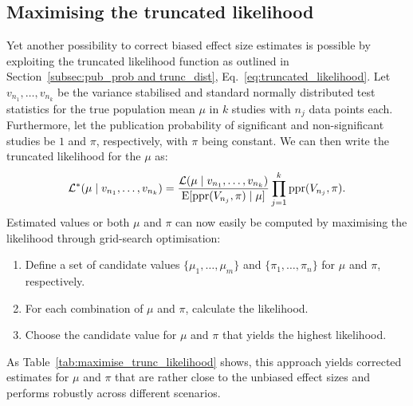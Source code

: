 \subsection{Maximising the truncated likelihood}
Yet another possibility to correct biased effect size estimates is possible by exploiting the truncated likelihood function as outlined in Section~\ref{subsec:pub_prob and trunc_dist}, Eq.~\ref{eq:truncated_likelihood}. Let $v_{n_1},\dots,v_{n_k}$ be the variance stabilised and standard normally distributed test statistics for the true population mean $\mu$ in $k$ studies with $n_j$ data points each. Furthermore, let the publication probability of significant and non-significant studies be $1$ and $\pi$, respectively, with $\pi$ being constant. We can then write the truncated likelihood for the $\mu$ as:
\begin{align*}
        \mathcal{L}^{*}(\mu \mid v_{n_1},\dots,v_{n_k}) = \frac{\mathcal{L}(\mu \mid v_{n_1},\dots,v_{n_k})}{\operatorname{\text{E}}[\operatorname{\text{ppr}}(V_{n_j},\pi)\mid \mu]}\prod_{j=1}^k \operatorname{\text{ppr}}(V_{n_j},\pi).
\end{align*}
Estimated values or both $\mu$ and $\pi$ can now easily be computed by maximising the likelihood through grid-search optimisation: 
\begin{enumerate}
    \item Define a set of candidate values $\{\mu_1,\dots,\mu_m\}$ and $\{\pi_1,\dots,\pi_n\}$ for $\mu$ and $\pi$, respectively.
    \item For each combination of $\mu$ and $\pi$, calculate the likelihood.
    \item Choose the candidate value for $\mu$ and $\pi$ that yields the highest likelihood.
\end{enumerate}
As Table~\ref{tab:maximise_trunc_likelihood} shows, this approach yields corrected estimates for $\mu$ and $\pi$ that are rather close to the unbiased effect sizes and performs robustly across different scenarios.
